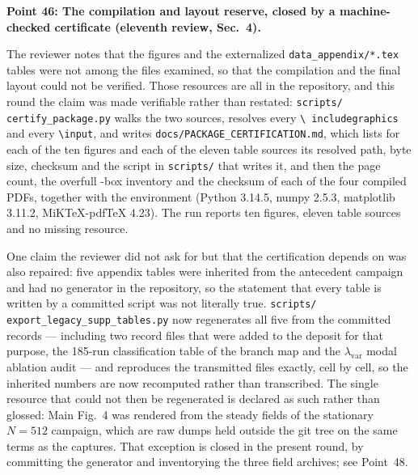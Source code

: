 \documentclass[11pt,a4paper]{article}
\begin{document}
\vspace{1em}

\noindent\textbf{Point 46: The compilation and layout reserve, closed by a machine-checked
certificate (eleventh review, Sec.~4).}

The reviewer notes that the figures and the externalized \texttt{data\_appendix/*.tex}
tables were not among the files examined, so that the compilation and the final layout
could not be verified. Those resources are all in the repository, and this round the
claim was made verifiable rather than restated: \texttt{scripts/}\hspace{0pt}\texttt{%
certify\_package.py} walks the two sources, resolves every \texttt{\textbackslash
includegraphics} and every \texttt{\textbackslash input}, and writes
\texttt{docs/}\hspace{0pt}\texttt{PACKAGE\_CERTIFICATION.md}, which lists for each of the
ten figures and each of the eleven table sources its resolved path, byte size, checksum
and the script in \texttt{scripts/} that writes it, and then the page count, the overfull
-box inventory and the checksum of each of the four compiled PDFs, together with the
environment (Python 3.14.5, numpy 2.5.3, matplotlib 3.11.2, MiKTeX-pdfTeX 4.23). The run
reports ten figures, eleven table sources and no missing resource.

One claim the reviewer did not ask for but that the certification depends on was also
repaired: five appendix tables were inherited from the antecedent campaign and had no
generator in the repository, so the statement that every table is written by a committed
script was not literally true. \texttt{scripts/}\hspace{0pt}\texttt{%
export\_legacy\_supp\_tables.py} now regenerates all five from the committed records ---
including two record files that were added to the deposit for that purpose, the
185-run classification table of the branch map and the \(\lambda_{\mathrm{var}}\) modal
ablation audit --- and reproduces the transmitted files exactly, cell by cell, so the
inherited numbers are now recomputed rather than transcribed. The single resource that
could not then be regenerated is declared as such rather than glossed: Main Fig.~4 was
rendered from the steady fields of the stationary \(N=512\) campaign, which are raw
dumps held outside the git tree on the same terms as the captures. That exception is
closed in the present round, by committing the generator and inventorying the three
field archives; see Point~48.
\end{document}
